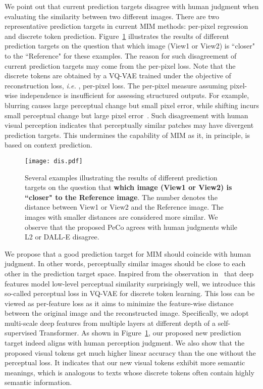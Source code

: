 \documentclass[letterpaper]{article} \usepackage{aaai23}  \usepackage{times}  \usepackage{helvet}  \usepackage{courier}  \usepackage[hyphens]{url}  \usepackage{graphicx} \urlstyle{rm} \def\UrlFont{\rm}  \usepackage{natbib}  \usepackage{caption} \frenchspacing  \setlength{\pdfpagewidth}{8.5in}  \setlength{\pdfpageheight}{11in}  \usepackage{algorithm}
\newcommand{\ie}{\textit{i.e. }}
\begin{document}
We point out that current prediction targets disagree with human judgment when evaluating the similarity between two different images.
There are two representative prediction targets in current MIM methods:
per-pixel regression and discrete token prediction.
Figure~\ref{fig:perceptual} illustrates the results of different prediction targets on the question that which image (View1 or View2) is ``closer" to the ``Reference" for these examples.
The reason for such disagreement of current prediction targets may come from 
the per-pixel loss. Note that the discrete tokens are obtained by a VQ-VAE trained under the objective of reconstruction loss, \ie, per-pixel loss.
The per-pixel measure assuming pixel-wise independence is insufficient for assessing structured outputs. For example, blurring causes large perceptual change but small pixel error, while shifting incurs small perceptual change but large pixel error~\cite{zhang2018unreasonable}.
Such disagreement with human visual perception indicates that perceptually similar patches may have divergent prediction targets.
This undermines the capability of MIM as it, in principle, is based on context prediction.


\begin{figure}[t]\centering
\texttt{[image: dis.pdf]}

\caption{Several examples illustrating the results of different prediction targets on the question that \textbf{which image (View1 or View2) is ``closer" to the Reference image}. The number denotes the distance between View1 or View2 and the Reference image. The images with smaller distances are considered more similar. We observe that the proposed PeCo agrees with human judgments while L2 or DALL-E disagree.}
\label{fig:perceptual}
\end{figure}

We propose that a good prediction target for MIM should coincide with human judgment. In other words, perceptually similar images should be close to each other in the prediction target space. Inspired from the observation in~\cite{zhang2018unreasonable} that deep features model low-level perceptual similarity surprisingly well, we introduce this so-called perceptual loss in VQ-VAE for discrete token learning. This loss can be viewed as per-feature loss as it aims to minimize the feature-wise distance between the original image and the reconstructed image. Specifically,
we adopt multi-scale deep features from multiple layers at different depth of a self-supervised Transformer. As shown in Figure~\ref{fig:perceptual}, our proposed new prediction target indeed aligns with human perception judgment.
We also show that the proposed visual tokens get much higher linear accuracy than the one without the perceptual loss. It indicates that our new visual tokens exhibit more semantic meanings, which is analogous to texts whose discrete tokens often contain highly semantic information.
\end{document}
